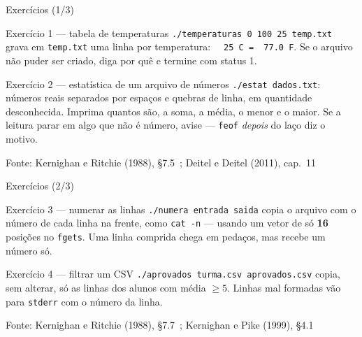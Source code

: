 \documentclass[aspectratio=169]{beamer}
\newcommand{\fonte}[1]{\vfill\hfill{\scriptsize\textcolor{UFSGray}{Fonte: #1}}}
\begin{document}
\begin{frame}{Exercícios (1/3)}
  \footnotesize
  \begin{block}{Exercício 1 --- tabela de temperaturas}
    \texttt{./temperaturas 0 100 25 temp.txt} grava em \texttt{temp.txt} uma
    linha por temperatura: \texttt{\ \ 25 C =\ \ 77.0 F}. Se o arquivo não
    puder ser criado, diga por quê e termine com status 1.
  \end{block}
  \begin{block}{Exercício 2 --- estatística de um arquivo de números}
    \texttt{./estat dados.txt}: números reais separados por espaços e
    quebras de linha, em quantidade desconhecida. Imprima quantos são, a
    soma, a média, o menor e o maior. Se a leitura parar em algo que não é
    número, avise --- \texttt{feof} \emph{depois} do laço diz o motivo.
  \end{block}
  \fonte{Kernighan e Ritchie (1988), §7.5~\cite{kernighan1988c};
    Deitel e Deitel (2011), cap.~11~\cite{deitel2011como}}
\end{frame}

\begin{frame}{Exercícios (2/3)}
  \footnotesize
  \begin{block}{Exercício 3 --- numerar as linhas}
    \texttt{./numera entrada saida} copia o arquivo com o número de cada
    linha na frente, como \texttt{cat -n} --- usando um vetor de só
    \textbf{16} posições no \texttt{fgets}. Uma linha comprida chega em
    pedaços, mas recebe um número só.
  \end{block}
  \begin{block}{Exercício 4 --- filtrar um CSV}
    \texttt{./aprovados turma.csv aprovados.csv} copia, sem alterar, só as
    linhas dos alunos com média $\geq 5$. Linhas mal formadas vão para
    \texttt{stderr} com o número da linha.
  \end{block}
  \fonte{Kernighan e Ritchie (1988), §7.7~\cite{kernighan1988c};
    Kernighan e Pike (1999), §4.1~\cite{kernighan1999practice}}
\end{frame}
\end{document}
